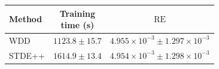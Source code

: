 \begin{tabular}{@{}lcc@{}}
    \toprule
    Method & \shortstack{Training\\time (s)} & $\operatorname{RE}$ \\
    \midrule
    WDD & $1123.8 \pm 15.7$ & $4.955 \times 10^{-3} \pm 1.297 \times 10^{-3}$ \\
    STDE++ & $1614.9 \pm 13.4$ & $4.954 \times 10^{-3} \pm 1.298 \times 10^{-3}$ \\
    \bottomrule
\end{tabular}
